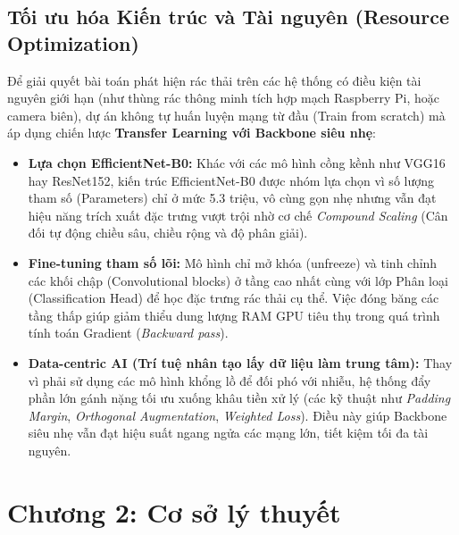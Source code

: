 \documentclass[12pt, a4paper]{article}
\begin{document}
\subsection{Tối ưu hóa Kiến trúc và Tài nguyên (Resource Optimization)}
Để giải quyết bài toán phát hiện rác thải trên các hệ thống có điều kiện tài nguyên giới hạn (như thùng rác thông minh tích hợp mạch Raspberry Pi, hoặc camera biên), dự án không tự huấn luyện mạng từ đầu (Train from scratch) mà áp dụng chiến lược \textbf{Transfer Learning với Backbone siêu nhẹ}:
\begin{itemize}
    \item \textbf{Lựa chọn EfficientNet-B0:} Khác với các mô hình cồng kềnh như VGG16 hay ResNet152, kiến trúc EfficientNet-B0 được nhóm lựa chọn vì số lượng tham số (Parameters) chỉ ở mức 5.3 triệu, vô cùng gọn nhẹ nhưng vẫn đạt hiệu năng trích xuất đặc trưng vượt trội nhờ cơ chế \textit{Compound Scaling} (Cân đối tự động chiều sâu, chiều rộng và độ phân giải).
    \item \textbf{Fine-tuning tham số lõi:} Mô hình chỉ mở khóa (unfreeze) và tinh chỉnh các khối chập (Convolutional blocks) ở tầng cao nhất cùng với lớp Phân loại (Classification Head) để học đặc trưng rác thải cụ thể. Việc đóng băng các tầng thấp giúp giảm thiểu dung lượng RAM GPU tiêu thụ trong quá trình tính toán Gradient (\textit{Backward pass}).
    \item \textbf{Data-centric AI (Trí tuệ nhân tạo lấy dữ liệu làm trung tâm):} Thay vì phải sử dụng các mô hình khổng lồ để đối phó với nhiễu, hệ thống đẩy phần lớn gánh nặng tối ưu xuống khâu tiền xử lý (các kỹ thuật như \textit{Padding Margin}, \textit{Orthogonal Augmentation}, \textit{Weighted Loss}). Điều này giúp Backbone siêu nhẹ vẫn đạt hiệu suất ngang ngửa các mạng lớn, tiết kiệm tối đa tài nguyên.
\end{itemize}


\section{Chương 2: Cơ sở lý thuyết}
\end{document}
